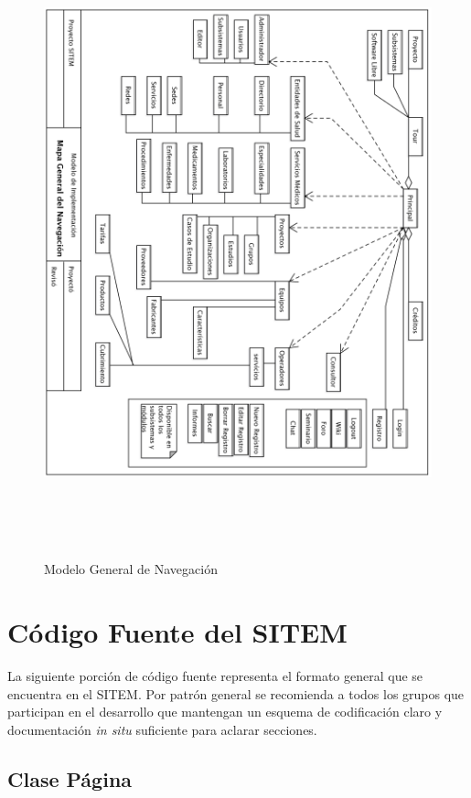 \begin{figure}
 \centering
 \includegraphics[width=156mm, height=182mm]{mapa_navegacion.png}
 \caption{Modelo General de Navegación}
 \label{mapa_navegacion}
\end{figure}

\section{Código Fuente del SITEM}

La siguiente porción de código fuente representa el formato general que se encuentra en el SITEM. Por patrón general se recomienda a todos los grupos que participan en el desarrollo que mantengan un esquema de codificación claro y documentación \textit{in situ} suficiente para aclarar secciones.

\subsection{Clase Página}

